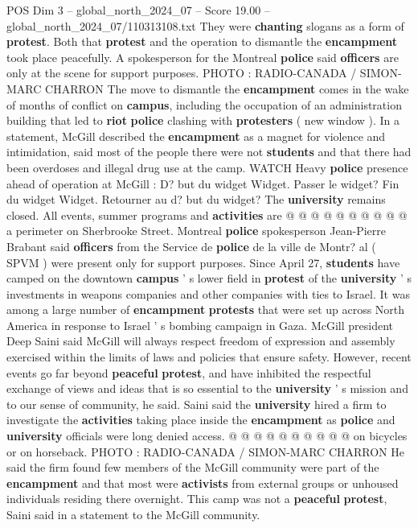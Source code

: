 \begin{textsample}{POS Dim 3 – global\_north\_2024\_07 – Score 19.00 – global\_north\_2024\_07/110313108.txt}
They were \textbf{chanting} slogans as a form of \textbf{protest}.
Both that \textbf{protest} and the operation to dismantle the \textbf{encampment} took place peacefully.
A spokesperson for the Montreal \textbf{police} said \textbf{officers} are only at the scene for support purposes.
PHOTO : RADIO-CANADA / SIMON-MARC CHARRON The move to dismantle the \textbf{encampment} comes in the wake of months of conflict on \textbf{campus}, including the occupation of an administration building that led to \textbf{riot} \textbf{police} clashing with \textbf{protesters} ( new window ).
In a statement, McGill described the \textbf{encampment} as a magnet for violence and intimidation, said most of the people there were not \textbf{students} and that there had been overdoses and illegal drug use at the camp.
WATCH Heavy \textbf{police} presence ahead of operation at McGill : D? but du widget Widget.
Passer le widget?
Fin du widget Widget.
Retourner au d? but du widget?
The \textbf{university} remains closed.
All events, summer programs and \textbf{activities} are @ @ @ @ @ @ @ @ @ @ a perimeter on Sherbrooke Street.
Montreal \textbf{police} spokesperson Jean-Pierre Brabant said \textbf{officers} from the Service de \textbf{police} de la ville de Montr? al ( SPVM ) were present only for support purposes.
Since April 27, \textbf{students} have camped on the downtown \textbf{campus} ' s lower field in \textbf{protest} of the \textbf{university} ' s investments in weapons companies and other companies with ties to Israel.
It was among a large number of \textbf{encampment} \textbf{protests} that were set up across North America in response to Israel ' s bombing campaign in Gaza.
McGill president Deep Saini said McGill will always respect freedom of expression and assembly exercised within the limits of laws and policies that ensure safety.
However, recent events go far beyond \textbf{peaceful} \textbf{protest}, and have inhibited the respectful exchange of views and ideas that is so essential to the \textbf{university} ' s mission and to our sense of community, he said.
Saini said the \textbf{university} hired a firm to investigate the \textbf{activities} taking place inside the \textbf{encampment} as \textbf{police} and \textbf{university} officials were long denied access. @ @ @ @ @ @ @ @ @ @ on bicycles or on horseback.
PHOTO : RADIO-CANADA / SIMON-MARC CHARRON He said the firm found few members of the McGill community were part of the \textbf{encampment} and that most were \textbf{activists} from external groups or unhoused individuals residing there overnight.
This camp was not a \textbf{peaceful} \textbf{protest}, Saini said in a statement to the McGill community.

\end{textsample}

